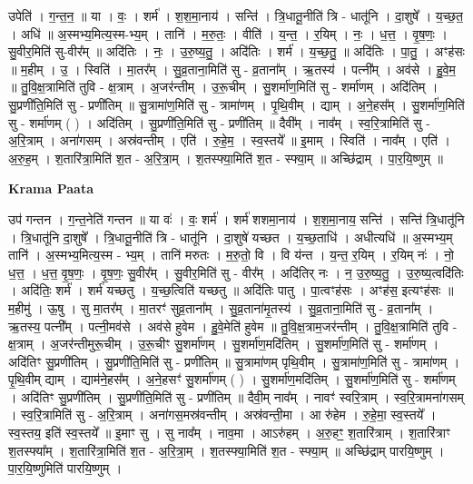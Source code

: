 \documentclass[17pt]{extarticle}
\begin{document}
उपेति॑ । ग॒न्त॒न॒ ॥ या । वः॒ । शर्म॑ । श॒श॒मा॒नाय॑ । सन्ति॑ । त्रि॒धातू॒नीति॑ त्रि - धातू॑नि । दा॒शुषे᳚ । य॒च्छ॒त॒ । अधि॑ ॥ अ॒स्मभ्य॒मित्य॒स्म-भ्य॒म् । तानि॑ । म॒रु॒तः॒ । वीति॑ । य॒न्त॒ । र॒यिम् । नः॒ । ध॒त्त॒ । वृ॒ष॒णः॒ । सु॒वीर॒मिति॑ सु-वीर᳚म् ॥ अदि॑तिः । नः॒ । उ॒रु॒ष्य॒तु॒ । अदि॑तिः । शर्म॑ । य॒च्छ॒तु॒ ॥ अदि॑तिः । पा॒तु॒ । अꣳह॑सः ॥ म॒हीम् । उ॒ । स्विति॑ । मा॒तर᳚म् । सु॒व्र॒ताना॒मिति॑ सु - व्र॒ताना᳚म् । ऋ॒तस्य॑ । पत्नी᳚म् । अव॑से । हु॒वे॒म॒ ॥ तु॒वि॒क्ष॒त्रामिति॑ तुवि - क्ष॒त्राम् । अ॒जर॑न्तीम् । उ॒रू॒चीम् । सु॒शर्मा॑ण॒मिति॑ सु - शर्मा॑णम् । अदि॑तिम् । सु॒प्रणी॑ति॒मिति॑ सु - प्रणी॑तिम् ॥ सु॒त्रामा॑ण॒मिति॑ सु - त्रामा॑णम् । पृ॒थि॒वीम् । द्याम् । अ॒ने॒हस᳚म् । सु॒शर्मा॑ण॒मिति॑ सु - शर्मा॑णम् ( ) । अदि॑तिम् । सु॒प्रणी॑ति॒मिति॑ सु - प्रणी॑तिम् ॥ दैवी᳚म् । नाव᳚म् । स्व॒रि॒त्रामिति॑ सु - अ॒रि॒त्राम् । अना॑गसम् । अस्र॑वन्तीम् । एति॑ । रु॒हे॒म॒ । स्व॒स्तये᳚ ॥ इ॒माम् । स्विति॑ । नाव᳚म् । एति॑ । अ॒रु॒ह॒म् । श॒तारि॑त्रा॒मिति॑ श॒त - अ॒रि॒त्रा॒म् । श॒तस्फ्या॒मिति॑ श॒त - स्फ्या॒म् ॥ अच्छि॑द्राम् । पा॒र॒यि॒ष्णुम् ॥  \newline


\textbf{Krama Paata} \newline

उप॑ गन्तन । ग॒न्त॒नेति॑ गन्तन ॥ या वः॑ । वः॒ शर्म॑ । शर्म॑ शशमा॒नाय॑ । श॒श॒मा॒नाय॒ सन्ति॑ । सन्ति॑ त्रि॒धातू॑नि । त्रि॒धातू॑नि दा॒शुषे᳚ । त्रि॒धातू॒नीति॑ त्रि - धातू॑नि । दा॒शुषे॑ यच्छत । य॒च्छ॒ताधि॑ । अधीत्यधि॑ ॥ अ॒स्मभ्य॒म् तानि॑ । अ॒स्मभ्य॒मित्य॒स्म - भ्य॒म् । तानि॑ मरुतः । म॒रु॒तो॒ वि । वि य॑न्त । य॒न्त॒ र॒यिम् । र॒यिम् नः॑ । नो॒ ध॒त्त॒ । ध॒त्त॒ वृ॒ष॒णः॒ । वृ॒ष॒णः॒ सु॒वीर᳚म् । सु॒वीर॒मिति॑ सु - वीर᳚म् । अदि॑तिर् नः । न॒ उ॒रु॒ष्य॒तु॒ । उ॒रु॒ष्य॒त्वदि॑तिः । अदि॑तिः॒ शर्म॑ । शर्म॑ यच्छतु । य॒च्छ॒त्विति॑ यच्छतु ॥ अदि॑तिः पातु । पा॒त्वꣳह॑सः । अꣳह॑स॒ इत्यꣳह॑सः ॥ म॒हीमु॑ । ऊ॒षु । सु मा॒तर᳚म् । मा॒तरꣳ॑ सुव्र॒ताना᳚म् । सु॒व्र॒ताना॑मृ॒तस्य॑ । सु॒व्र॒ताना॒मिति॑ सु - व्र॒ताना᳚म् । ऋ॒तस्य॒ पत्नी᳚म् । पत्नी॒मव॑से । अव॑से हुवेम । हु॒वे॒मेति॑ हुवेम ॥ तु॒वि॒क्ष॒त्राम॒जर॑न्तीम् । तु॒वि॒क्ष॒त्रामिति॑ तुवि - क्ष॒त्राम् । अ॒जर॑न्तीमुरू॒चीम् । उ॒रू॒चीꣳ सु॒शर्मा॑णम् । सु॒शर्मा॑ण॒मदि॑तिम् । सु॒शर्मा॑ण॒मिति॑ सु - शर्मा॑णम् । अदि॑तिꣳ सु॒प्रणी॑तिम् । सु॒प्रणी॑ति॒मिति॑ सु - प्रणी॑तिम् ॥ सु॒त्रामा॑णम् पृथि॒वीम् । सु॒त्रामा॑ण॒मिति॑ सु - त्रामा॑णम् । पृ॒थि॒वीम् द्याम् । द्याम॑ने॒हस᳚म् । 
अ॒ने॒हसꣳ॑ सु॒शर्मा॑णम् ( ) । सु॒शर्मा॑ण॒मदि॑तिम् । सु॒शर्मा॑ण॒मिति॑ सु - शर्मा॑णम् । अदि॑तिꣳ सु॒प्रणी॑तिम् । सु॒प्रणी॑ति॒मिति॑ सु - प्रणी॑तिम् ॥ दैवी॒म् नाव᳚म् । नावꣳ॑ स्वरि॒त्राम् । स्व॒रि॒त्रामना॑गसम् । स्व॒रि॒त्रामिति॑ सु - अ॒रि॒त्राम् । अना॑गस॒मस्र॑वन्तीम् । अस्र॑वन्ती॒मा । आ रु॑हेम । रु॒हे॒मा॒ स्व॒स्तये᳚ । स्व॒स्तय॒ इति॑ स्व॒स्तये᳚ ॥ इ॒माꣳ सु । सु नाव᳚म् । नाव॒मा । आऽरु॑हम् । अ॒रु॒हꣳ॒॒ श॒तारि॑त्राम् । श॒तारि॑त्राꣳ श॒तस्फ्या᳚म् । श॒तारि॑त्रा॒मिति॑ श॒त - अ॒रि॒त्रा॒म् । श॒तस्फ्या॒मिति॑ श॒त - स्फ्या॒म् ॥ अच्छि॑द्राम् पारयि॒ष्णुम् । पा॒र॒यि॒ष्णुमिति॑ पारयि॒ष्णुम् । \newline
\end{document}
